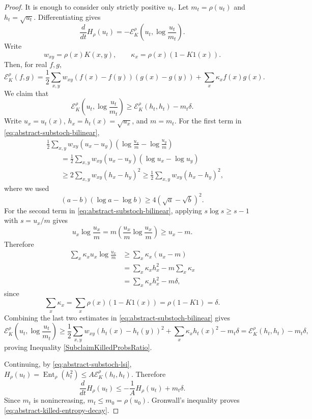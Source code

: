 \documentclass[11pt, reqno]{amsart}
\numberwithin{equation}{section}
\newcommand{\Ent}{\operatorname{Ent}}
\newcommand{\cE}{\mathcal E}
\begin{document}
\begin{proof}
It is enough to consider only strictly positive \(u_t\).  Let 
\(m_t=\rho(u_t)\) and \(h_t=\sqrt{u_t}\).  Differentiating gives
\[
    \frac{d}{dt}H_\rho(u_t)
    =-\cE_K^\rho\left(u_t,\log\frac{u_t}{m_t}\right).
\]
Write
\[
    w_{xy}=\rho(x)K(x,y),
    \qquad
    \kappa_x=\rho(x)(1-K1(x)).
\]
Then, for real \(f,g\),
\begin{equation}\label{eq:abstract-substoch-bilinear}
    \cE_K^\rho(f,g)
    =
    \frac12\sum_{x,y}w_{xy}(f(x)-f(y))(g(x)-g(y))
    +\sum_x\kappa_x f(x)g(x).
\end{equation}
We claim that
\begin{equation} \label{SubclaimKilledProbsRatio}
    \cE_K^\rho\left(u_t,\log\frac{u_t}{m_t}\right)
    \ge
    \cE_K^\rho(h_t,h_t)-m_t\delta.
\end{equation}
Write \(u_x=u_t(x)\), \(h_x=h_t(x)=\sqrt{u_x}\), and \(m=m_t\).  For the
first term in \eqref{eq:abstract-substoch-bilinear},
\[
\begin{aligned}
&\frac12\sum_{x,y}w_{xy}(u_x-u_y)
\left(\log\frac{u_x}{m}-\log\frac{u_y}{m}\right)  \\
&\qquad =
\frac12\sum_{x,y}w_{xy}(u_x-u_y)(\log u_x-\log u_y)  \\
&\qquad \ge
2\sum_{x,y}w_{xy}(h_x-h_y)^2
\ge
\frac12\sum_{x,y}w_{xy}(h_x-h_y)^2,
\end{aligned}
\]
where we used
\[
    (a-b)(\log a-\log b)\ge 4(\sqrt a-\sqrt b)^2.
\]
For the second term in \eqref{eq:abstract-substoch-bilinear}, applying
\(s\log s\ge s-1\) with \(s=u_x/m\) gives
\[
    u_x\log\frac{u_x}{m}
    =
    m\left(\frac{u_x}{m}\log\frac{u_x}{m}\right)
    \ge
    u_x-m.
\]
Therefore
\[
\begin{aligned}
    \sum_x\kappa_x u_x\log\frac{u_x}{m}
    &\ge
    \sum_x\kappa_x(u_x-m)  \\
    &=
    \sum_x\kappa_x h_x^2
    -
    m\sum_x\kappa_x  \\
    &=
    \sum_x\kappa_x h_x^2
    -
    m\delta,
\end{aligned}
\]
since
\[
    \sum_x\kappa_x
    =
    \sum_x\rho(x)(1-K1(x))
    =
    \rho(1-K1)
    =
    \delta.
\]
Combining the last two estimates in \eqref{eq:abstract-substoch-bilinear}
gives
\[
    \cE_K^\rho\left(u_t,\log\frac{u_t}{m_t}\right)
    \ge
    \frac12\sum_{x,y}w_{xy}(h_t(x)-h_t(y))^2
    +\sum_x\kappa_xh_t(x)^2
    -m_t\delta
    =
    \cE_K^\rho(h_t,h_t)-m_t\delta,
\]
proving Inequality \eqref{SubclaimKilledProbsRatio}.

Continuing, by \eqref{eq:abstract-substoch-lsi},
\(H_\rho(u_t)=\Ent_\rho(h_t^2)\le A\cE_K^\rho(h_t,h_t)\).  Therefore
\[
    \frac{d}{dt}H_\rho(u_t)
    \le
    -\frac1A H_\rho(u_t)+m_t\delta.
\]
Since \(m_t\) is nonincreasing, \(m_t\le m_0=\rho(u_0)\).  Gronwall's
inequality proves \eqref{eq:abstract-killed-entropy-decay}.
\end{proof}
\end{document}
